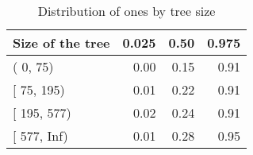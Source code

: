 \begin{table}[ht]
\centering
\begin{tabular}{lrrr}
  \toprule
Size of the tree & 0.025 & 0.50 & 0.975 \\ 
  \midrule
{(   0,  75)} & 0.00 & 0.15 & 0.91 \\ 
  {[  75, 195)} & 0.01 & 0.22 & 0.91 \\ 
  {[ 195, 577)} & 0.02 & 0.24 & 0.91 \\ 
  {[ 577, Inf)} & 0.01 & 0.28 & 0.95 \\ 
   \bottomrule
\end{tabular}
\caption{Distribution of ones by tree size} 
\end{table}

